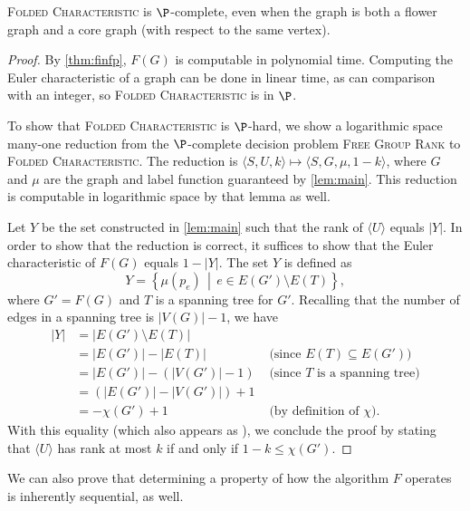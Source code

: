 \documentclass{article}
\newcommand{\FGR}{\textsc{Free Group Rank}}
\newcommand{\FC}{\textsc{Folded Characteristic}}
\newcommand{\gen}[1]{\langle #1 \rangle}
\begin{document}
\begin{theorem}\label{thm:fdpcomplete}
  \FC{} is $\P$-complete, even when the graph is both a flower graph and a core graph (with respect to the same vertex).
\end{theorem}
\begin{proof}
  By \autoref{thm:finfp}, $F(G)$ is computable in polynomial time.
  Computing the Euler characteristic of a graph can be done in linear time, as can comparison with an integer, so \FC{} is in $\P$.

  To show that \FC{} is $\P$-hard, we show a logarithmic space many-one reduction from the $\P$-complete decision problem \FGR{} to \FC{}.
  The reduction is $\langle S, U, k \rangle \mapsto \langle S, G, \mu, 1 - k \rangle$, where $G$ and $\mu$ are the graph and label function guaranteed by \autoref{lem:main}.
  This reduction is computable in logarithmic space by that lemma as well.

  Let $Y$ be the set constructed in \autoref{lem:main} such that the rank of $\gen{U}$ equals $|Y|$.
  In order to show that the reduction is correct, it suffices to show that the Euler characteristic of $F(G)$ equals $1 - |Y|$.
  The set $Y$ is defined as
  \begin{equation*}
    Y = \left\{\mu(p_e) \, \middle| \, e \in E(G') \setminus E(T) \right\},
  \end{equation*}
  where $G' = F(G)$ and $T$ is a spanning tree for $G'$.
  Recalling that the number of edges in a spanning tree is $|V(G)| - 1$, we have
  \begin{align*}
    |Y| & = |E(G') \setminus E(T)| & \\
    & = |E(G')| - |E(T)| & \text{ (since } E(T) \subseteq E(G') \text{)} \\
    & = |E(G')| - (|V(G')| - 1) & \text{ (since } T \text{ is a spanning tree)} \\
    & = (|E(G')| - |V(G')|) + 1 & \\
    & = -\chi(G') + 1 & \text{ (by definition of } \chi \text{)}.
  \end{align*}
  With this equality (which also appears as \autocite[Lemma~8.2]{km02}), we conclude the proof by stating that $\gen{U}$ has rank at most $k$ if and only if $1 - k \leq \chi(G')$.
\end{proof}

We can also prove that determining a property of how the algorithm $F$ operates is inherently sequential, as well.
\end{document}
